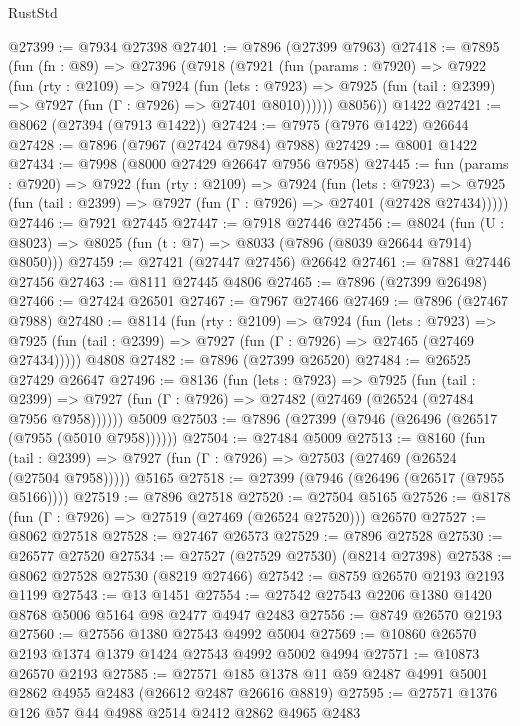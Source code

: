 \begin{lexlean}{RustStd}
\begin{coremodule}
@27399 := @7934 @27398
@27401 := @7896 (@27399 @7963)
@27418 := @7895
    (fun (fn : @89) =>
    @27396
      (@7918
        (@7921
          (fun (params : @7920) =>
          @7922
            (fun (rty : @2109) =>
            @7924
              (fun (lets : @7923) =>
              @7925 (fun (tail : @2399) => @7927 (fun (Γ : @7926) => @27401 @8010))))))
        @8056))
    @1422
@27421 := @8062 (@27394 (@7913 @1422))
@27424 := @7975 (@7976 @1422) @26644
@27428 := @7896 (@7967 (@27424 @7984) @7988)
@27429 := @8001 @1422
@27434 := @7998 (@8000 @27429 @26647 @7956 @7958)
@27445 := fun (params : @7920) =>
  @7922
    (fun (rty : @2109) =>
    @7924
      (fun (lets : @7923) =>
      @7925 (fun (tail : @2399) => @7927 (fun (Γ : @7926) => @27401 (@27428 @27434)))))
@27446 := @7921 @27445
@27447 := @7918 @27446
@27456 := @8024
    (fun (U : @8023) => @8025 (fun (t : @7) => @8033 (@7896 (@8039 @26644 @7914) @8050)))
@27459 := @27421 (@27447 @27456) @26642
@27461 := @7881 @27446 @27456
@27463 := @8111 @27445 @4806
@27465 := @7896 (@27399 @26498)
@27466 := @27424 @26501
@27467 := @7967 @27466
@27469 := @7896 (@27467 @7988)
@27480 := @8114
    (fun (rty : @2109) =>
    @7924
      (fun (lets : @7923) =>
      @7925 (fun (tail : @2399) => @7927 (fun (Γ : @7926) => @27465 (@27469 @27434)))))
    @4808
@27482 := @7896 (@27399 @26520)
@27484 := @26525 @27429 @26647
@27496 := @8136
    (fun (lets : @7923) =>
    @7925
      (fun (tail : @2399) =>
      @7927 (fun (Γ : @7926) => @27482 (@27469 (@26524 (@27484 @7956 @7958))))))
    @5009
@27503 := @7896 (@27399 (@7946 (@26496 (@26517 (@7955 (@5010 @7958))))))
@27504 := @27484 @5009
@27513 := @8160
    (fun (tail : @2399) => @7927 (fun (Γ : @7926) => @27503 (@27469 (@26524 (@27504 @7958)))))
    @5165
@27518 := @27399 (@7946 (@26496 (@26517 (@7955 @5166))))
@27519 := @7896 @27518
@27520 := @27504 @5165
@27526 := @8178 (fun (Γ : @7926) => @27519 (@27469 (@26524 @27520))) @26570
@27527 := @8062 @27518
@27528 := @27467 @26573
@27529 := @7896 @27528
@27530 := @26577 @27520
@27534 := @27527 (@27529 @27530) (@8214 @27398)
@27538 := @8062 @27528 @27530 (@8219 @27466)
@27542 := @8759 @26570 @2193 @2193 @1199
@27543 := @13 @1451
@27554 := @27542 @27543 @2206 @1380 @1420 @8768 @5006 @5164 @98 @2477 @4947 @2483
@27556 := @8749 @26570 @2193
@27560 := @27556 @1380 @27543 @4992 @5004
@27569 := @10860 @26570 @2193 @1374 @1379 @1424 @27543 @4992 @5002 @4994
@27571 := @10873 @26570 @2193
@27585 := @27571 @185 @1378 @11 @59 @2487 @4991 @5001 @2862 @4955 @2483 (@26612 @2487 @26616 @8819)
@27595 := @27571 @1376 @126 @57 @44 @4988 @2514 @2412 @2862 @4965 @2483

\end{coremodule}
\end{lexlean}
